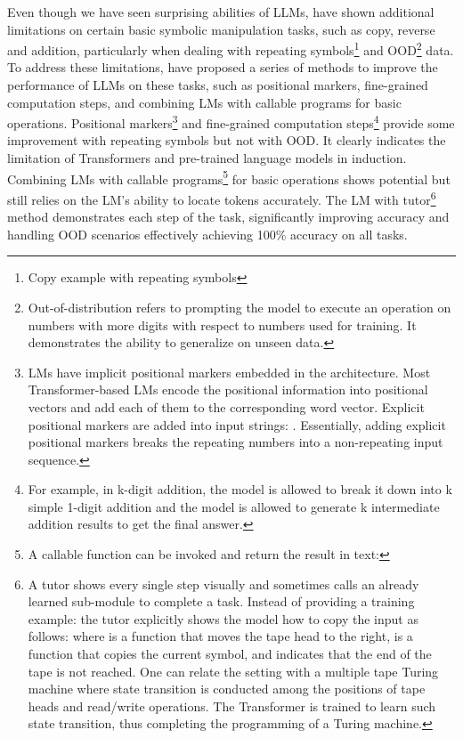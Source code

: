 Even though we have seen surprising abilities of LLMs, \textcite{qian2022limitations} have shown additional limitations on certain basic symbolic manipulation tasks, such as copy, reverse and addition, particularly when dealing with repeating symbols\footnote{Copy example with repeating symbols } and OOD\footnote{Out-of-distribution refers to prompting the model to execute an operation on numbers with more digits with respect to numbers used for training. It demonstrates the ability to generalize on unseen data.} data.
To address these limitations, \textcite{qian2022limitations} have proposed a series of methods to improve the performance of LLMs on these tasks, such as positional markers, fine-grained computation steps, and combining LMs with callable programs for basic operations.
Positional markers\footnote{LMs have implicit positional markers embedded in the architecture. Most Transformer-based LMs encode the positional information into positional vectors and add each of
	them to the corresponding word vector. Explicit positional markers are added into input strings: .
	Essentially, adding explicit positional markers breaks the repeating numbers into a non-repeating input sequence.} and fine-grained computation steps\footnote{For example, in k-digit addition, the model is allowed to break it down into k simple 1-digit addition and the model is allowed to generate k intermediate addition results to get the final answer.} provide some improvement with repeating symbols but not with OOD\@.
It clearly indicates the limitation of Transformers and pre-trained language models in induction.
Combining LMs with callable programs\footnote{A callable function  can be invoked and return the result in text: } for basic operations shows potential but still relies on the LM's ability to locate tokens accurately.
The LM with tutor\footnote{A tutor shows every single step visually and sometimes calls an already learned sub-module to complete a task. Instead of providing a training example:  the tutor explicitly shows the model how to copy the input as follows:  where  is a function that moves the tape head to the right,  is a function that copies the current symbol, and  indicates that the end of the tape is not reached. One can relate the setting with a multiple tape Turing machine where state transition is conducted among the positions of tape heads and read/write operations. The Transformer is trained to learn such state transition, thus completing the programming of a Turing machine.} method demonstrates each step of the task, significantly improving accuracy and handling OOD scenarios effectively achieving 100\% accuracy on all tasks.

